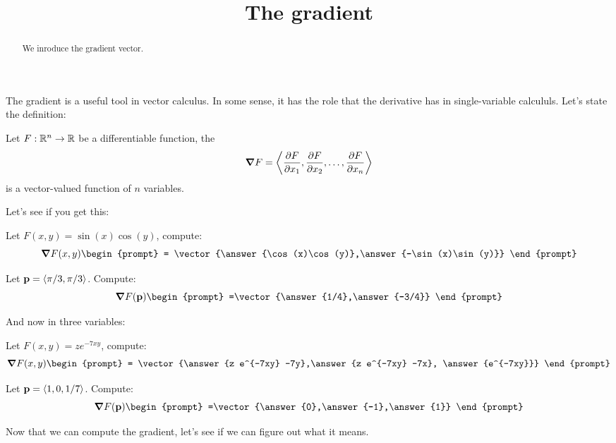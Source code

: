 \documentclass{ximera}
\title[Dig-In:]{The gradient}
\begin{document}
\begin{abstract}
We inroduce the gradient vector. 
\end{abstract}
\maketitle

The gradient is a useful tool in vector calculus. In some sense, it
has the role that the derivative has in single-variable calcululs.
Let's state the definition:

\begin{definition}
  Let $F:\R^n\to \R$ be a differentiable function, the 
  \[
  \grad F = \vector{\pp[F]{x_1},\pp[F]{x_2},\dots,\pp[F]{x_n}}
  \]
  is a vector-valued function of $n$ variables. 
\end{definition}

Let's see if you get this:


\begin{question}
  Let $F(x,y) = \sin(x)\cos(y)$, compute:
  \[
  \grad F(x,y)
  \begin{prompt}
    = \vector{\answer{\cos(x)\cos(y)},\answer{-\sin(x)\sin(y)}}
  \end{prompt}
  \]
  \begin{question}
    Let $\vec{p}= \vector{\pi/3,\pi/3}$. Compute:
    \[
    \grad F(\vec{p})
    \begin{prompt}
      =\vector{\answer{1/4},\answer{-3/4}}
    \end{prompt}
    \]
  \end{question}
\end{question}

And now in three variables:

\begin{question}
  Let $F(x,y) = ze^{-7xy}$, compute:
  \[
  \grad F(x,y)
  \begin{prompt}
    = \vector{\answer{z e^{-7xy} -7y},\answer{z e^{-7xy} -7x}, \answer{e^{-7xy}}}
  \end{prompt}
  \]
  \begin{question}
    Let $\vec{p}= \vector{1,0,1/7}$. Compute:
    \[
    \grad F(\vec{p})
    \begin{prompt}
      =\vector{\answer{0},\answer{-1},\answer{1}}
    \end{prompt}
    \]
  \end{question}
\end{question}

Now that we can compute the gradient, let's see if we can figure out
what it means.
\end{document}
